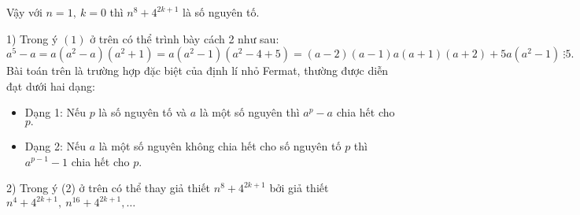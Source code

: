 \begin{ex}
{	Vậy với $n=1,\ k=0$ thì $n^8+4^{2k+1}$ là số nguyên tố.\\  
}
\begin{nx} 
	1) Trong ý $(1)$ ở trên có thể trình bày cách 2 như sau:
	\[a^5-a=a(a^2-a)(a^2+1)=a(a^2-1)(a^2-4+5)=(a-2)(a-1)a(a+1)(a+2)+5a(a^2-1)\ \vdots 5.\]
	Bài toán trên là trường hợp đặc biệt của định lí nhỏ Fermat, thường được diễn đạt dưới hai dạng:
	\begin{itemize}
\item Dạng 1: Nếu $p$ là số nguyên tố và $a$ là một số nguyên thì $a^p-a$ chia hết cho $p.$
\item Dạng 2: Nếu $a$ là một số nguyên không chia hết cho số nguyên tố $p$ thì $a^{p-1}-1$ chia hết cho $p.$
\end{itemize}
	2) Trong ý (2) ở trên có thể thay giả thiết $n^8+4^{2k+1}$ bởi giả thiết $n^4+4^{2k+1},\ n^{16}+4^{2k+1},\dots$
	\end{nx}
\end{ex}

